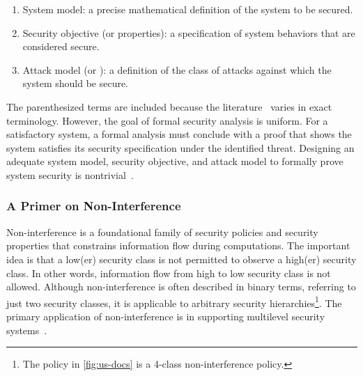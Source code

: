 \begin{enumerate}

\item System model: a precise mathematical definition of the system to be secured.

\item Security objective (or properties):
a specification of system behaviors that are considered secure.

\item Attack model (or ):
a definition of the class of attacks against which the system should be secure.
\end{enumerate}
The parenthesized terms are included because the literature~\cite{bognar2022, bau2011} varies in exact terminology.
However, the goal of formal security analysis is uniform.
For a satisfactory system, a formal analysis must conclude with a proof that shows the system satisfies its security specification under the identified threat.
Designing an adequate system model, 
security objective, 
and attack model to formally prove system security is nontrivial~\cite{piessens2024}.

\subsubsection{A Primer on Non-Interference}
\label{subsec:ni}

Non-interference
is a foundational family of security policies and security properties
 that constrains information flow during computations.
The important idea is that a low(er) security class is not permitted to observe a high(er) security class.
In other words, information flow from high to low security class is not allowed.
Although non-interference
 is often described in binary terms, referring to just two security classes, it is applicable to arbitrary security hierarchies\footnote{The policy in \autoref{fig:us-docs} is a 4-class non-interference policy.}.
The primary application of non-interference 
is in supporting multilevel security systems~\cite{roscoe1999}.

